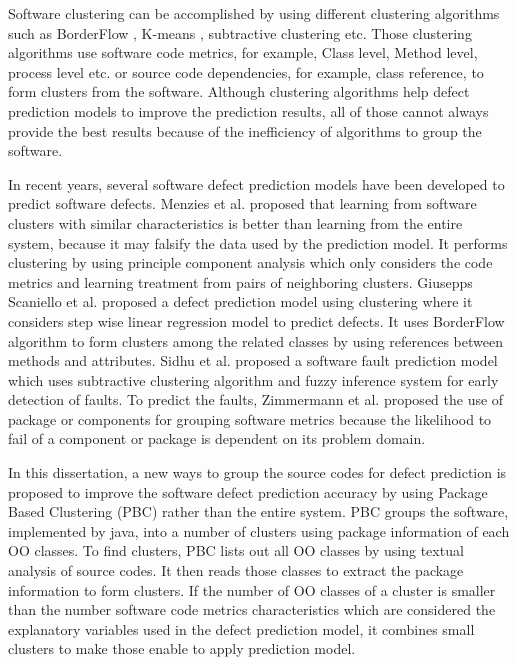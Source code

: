 \documentclass[12pt]{report}
\begin{document}
Software clustering can be accomplished by using different clustering algorithms such as BorderFlow \cite{}, K-means \cite{}, subtractive \cite{} clustering etc. Those clustering algorithms use software code metrics, for example, Class level, Method level, process level etc. or source code dependencies, for example, class reference, to form clusters from the software. Although clustering algorithms help defect prediction models to improve the prediction results, all of those cannot always provide the best results because of the inefficiency of algorithms to group the software.

In recent years, several software defect prediction models have been developed to predict software defects. Menzies et al. \cite{menzies2013local,menzies2011local} proposed that learning from software clusters with similar characteristics is better than learning from the entire system, because it may falsify the data used by the prediction model. It performs clustering by using principle component analysis which only considers the code metrics and learning treatment from pairs of neighboring clusters. Giusepps Scaniello et al.\cite{scanniello2013class} proposed a defect prediction model using clustering where it considers step wise linear regression model to predict defects. It uses BorderFlow algorithm to form clusters among the related classes by using references between methods and attributes. Sidhu et al. \cite{sidhu2010subtractive} proposed a software fault prediction model which uses subtractive clustering algorithm and fuzzy inference system for early detection of faults. To predict the faults, Zimmermann et al.\cite{zimmermann2007predicting}  proposed the use of package or components for grouping software metrics because the likelihood to fail of a component or package is dependent on its problem domain.

In this dissertation, a new ways to group the source codes for defect prediction is proposed to improve the software defect prediction accuracy by using Package Based Clustering (PBC) rather than the entire system.
PBC groups the software, implemented by java, into a number of clusters using package information of each OO classes. To find clusters, PBC lists out all OO classes by using textual analysis of source codes. It then reads those classes to extract the package information to form clusters. If the number of OO classes of a cluster is smaller than the number software code metrics characteristics which are considered the explanatory variables used in the defect prediction model, it combines small clusters to make those enable to apply prediction model.
\end{document}
